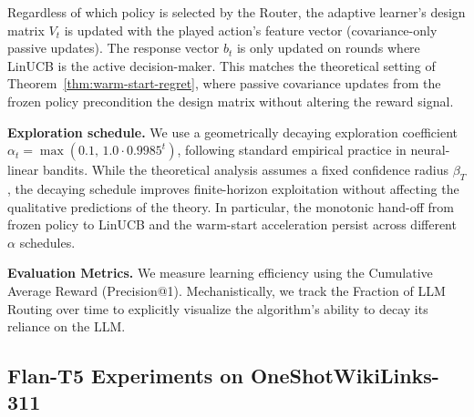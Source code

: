 Regardless of which policy is selected by the Router, the adaptive learner's design matrix $V_t$ is updated with the played action's feature vector (covariance-only passive updates). The response vector $b_t$ is only updated on rounds where LinUCB is the active decision-maker. This matches the theoretical setting of Theorem~\ref{thm:warm-start-regret}, where passive covariance updates from the frozen policy precondition the design matrix without altering the reward signal.

\textbf{Exploration schedule.} We use a geometrically decaying exploration coefficient $\alpha_t = \max(0.1,\, 1.0 \cdot 0.9985^t)$, following standard empirical practice in neural-linear bandits. While the theoretical analysis assumes a fixed confidence radius $\beta_T$, the decaying schedule improves finite-horizon exploitation without affecting the qualitative predictions of the theory. In particular, the monotonic hand-off from frozen policy to LinUCB and the warm-start acceleration persist across different $\alpha$ schedules.

\textbf{Evaluation Metrics.} We measure learning efficiency using the Cumulative Average Reward (Precision@1). Mechanistically, we track the Fraction of LLM Routing over time to explicitly visualize the algorithm's ability to decay its reliance on the LLM.

\subsection{Flan-T5 Experiments on OneShotWikiLinks-311}
\label{sec:wiki_v1}

